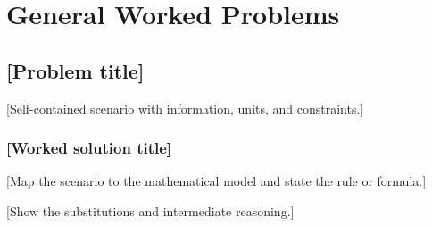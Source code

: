 
\section{General Worked Problems}
\label{sec:general-worked}


\subsection{[Problem title]}
\label{prob:example}

[Self-contained scenario with information, units, and constraints.]


\subsubsection*{[Worked solution title]}
\label{sol:example-task}

[Map the scenario to the mathematical model and state the rule or formula.]

[Show the substitutions and intermediate reasoning.]

